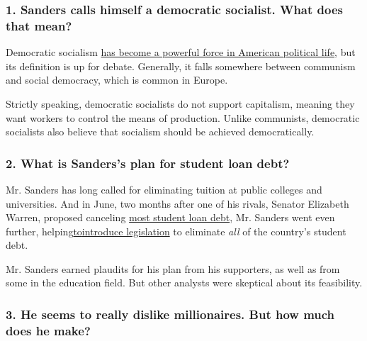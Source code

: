 \hypertarget{1-sanders-calls-himself-a-democratic-socialist-what-does-that-mean}{%
\subsubsection{\texorpdfstring{\textbf{1. Sanders calls himself a
democratic socialist. What does that
mean?}}{1. Sanders calls himself a democratic socialist. What does that mean?}}\label{1-sanders-calls-himself-a-democratic-socialist-what-does-that-mean}}

Democratic socialism
\href{https://www.nytimes.com/2019/06/12/us/politics/democratic-socialism-facts-history.html}{has
become a powerful force in American political life}, but its definition
is up for debate. Generally, it falls somewhere between communism and
social democracy, which is common in Europe.

Strictly speaking, democratic socialists do not support capitalism,
meaning they want workers to control the means of production. Unlike
communists, democratic socialists also believe that socialism should be
achieved democratically.

\hypertarget{2-what-is-sanderss-plan-for-student-loan-debt}{%
\subsubsection{\texorpdfstring{\textbf{2. What is Sanders's plan for
student loan
debt?}}{2. What is Sanders's plan for student loan debt?}}\label{2-what-is-sanderss-plan-for-student-loan-debt}}

Mr. Sanders has long called for eliminating tuition at public colleges
and universities. And in June, two months after one of his rivals,
Senator Elizabeth Warren, proposed canceling
\href{https://www.nytimes.com/2019/04/22/us/politics/elizabeth-warren-student-debt.html}{most
student loan debt}, Mr. Sanders went even further,
helping\href{https://www.nytimes.com/2019/06/24/us/politics/bernie-sanders-student-debt.html}{to}\href{https://www.nytimes.com/2019/06/24/us/politics/bernie-sanders-student-debt.html}{introduce
legislation} to eliminate \emph{all} of the country's student debt.

Mr. Sanders earned plaudits for his plan from his supporters, as well as
from some in the education field. But other analysts were skeptical
about its feasibility.

\hypertarget{3-he-seems-to-really-dislike-millionaires-but-how-much-does-he-make}{%
\subsubsection{\texorpdfstring{\textbf{3. He seems to really dislike
millionaires. But how much does he
make?}}{3. He seems to really dislike millionaires. But how much does he make?}}\label{3-he-seems-to-really-dislike-millionaires-but-how-much-does-he-make}}

